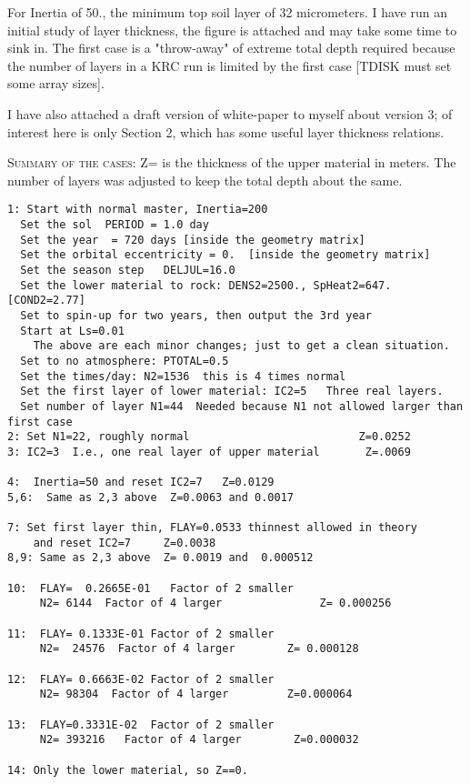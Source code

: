 \documentclass{article}  %
\begin{document}
For Inertia of 50., the minimum top soil layer of 32 micrometers. I have run an
initial study of layer thickness, the figure is attached and may take some time
to sink in. The first case is a "throw-away" of extreme total depth required
because the number of layers in a KRC run is limited by the first case [TDISK
must set some array sizes]. 

I have also attached a draft version of white-paper to myself about version
3; of interest here is only Section 2, which has some useful layer thickness
relations.

\textsc{Summary of the cases:} Z= is the thickness of the upper material in
meters. The number of layers was adjusted to keep the total depth about the
same.

\vspace{-3.mm} 
\begin{verbatim}
1: Start with normal master, Inertia=200    
  Set the sol  PERIOD = 1.0 day
  Set the year  = 720 days [inside the geometry matrix]
  Set the orbital eccentricity = 0.  [inside the geometry matrix]
  Set the season step   DELJUL=16.0
  Set the lower material to rock: DENS2=2500., SpHeat2=647. [COND2=2.77]
  Set to spin-up for two years, then output the 3rd year
  Start at Ls=0.01
    The above are each minor changes; just to get a clean situation.
  Set to no atmosphere: PTOTAL=0.5
  Set the times/day: N2=1536  this is 4 times normal
  Set the first layer of lower material: IC2=5   Three real layers.
  Set number of layer N1=44  Needed because N1 not allowed larger than first case
2: Set N1=22, roughly normal                          Z=0.0252
3: IC2=3  I.e., one real layer of upper material       Z=.0069

4:  Inertia=50 and reset IC2=7   Z=0.0129
5,6:  Same as 2,3 above  Z=0.0063 and 0.0017

7: Set first layer thin, FLAY=0.0533 thinnest allowed in theory
    and reset IC2=7     Z=0.0038
8,9: Same as 2,3 above  Z= 0.0019 and  0.000512

10:  FLAY=  0.2665E-01   Factor of 2 smaller
     N2= 6144  Factor of 4 larger               Z= 0.000256

11:  FLAY= 0.1333E-01 Factor of 2 smaller
     N2=  24576  Factor of 4 larger        Z= 0.000128 

12:  FLAY= 0.6663E-02 Factor of 2 smaller
     N2= 98304  Factor of 4 larger         Z=0.000064

13:  FLAY=0.3331E-02  Factor of 2 smaller
     N2= 393216   Factor of 4 larger        Z=0.000032

14: Only the lower material, so Z==0.
\end{verbatim}
\end{document}
